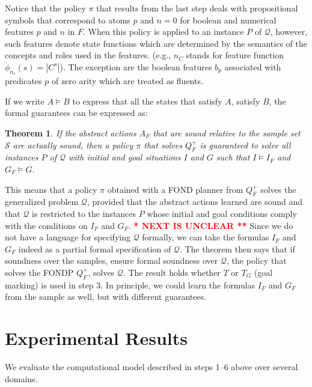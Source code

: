 \documentclass[letterpaper]{article} %
\newtheorem{theorem}[definition]{Theorem}
\newcommand{\Q}{\mathcal{Q}}
\renewcommand{\S}{\mathcal{S}}
\begin{document}
Notice that the policy $\pi$ that results from the last step deals with
propositional symbols that correspond to atoms $p$ and $n=0$ for boolean
and numerical features $p$ and $n$ in $F$.
When this policy is applied to an instance $P$ of $\Q$, however, such features denote state functions
which are determined by the  semantics of the concepts and roles used in  the features.
(e.g., $n_C$ stands for feature function $\phi_{n_c}(s)=|C^s|$).
The exception are the boolean features $b_p$ associated with
predicates $p$ of zero arity which are treated as fluents.

If we write $A \vDash B$ to express that all the states that satisfy $A$, satisfy $B$, 
the formal guarantees can be expressed as:

\begin{theorem}
If the abstract actions $A_F$ that are sound relative to the sample set $\S$  are actually sound,
then a   policy $\pi$ that solves  $Q^+_F$  is guaranteed to solve  all instances $P$ of $\Q$
with initial and goal situations $I$ and $G$ such that $I \vDash  I_F$ and $G_F \vDash G$.
\end{theorem}

This means that a policy $\pi$ obtained with a FOND planner from $Q^+_F$ 
solves the generalized problem $\Q$, provided that the abstract actions
learned are sound and that $\Q$ is restricted to the instances $P$ whose
initial and goal conditions comply with the conditions on $I_F$ and $G_F$.
\textcolor{red}{\bf ** NEXT IS UNCLEAR **}
Since we do not have a language for specifying $\Q$ formally, we can take
the formulas $I_F$ and $G_F$ indeed as a partial formal specification of
$\Q$. The theorem then says that if soundness over the samples, ensure
formal soundness over $\Q$, the policy that solves the FONDP $Q^+_F$,
solves $\Q$. The result holds whether $T$ or $T_G$ (goal marking) is used in step 3.
In principle, we could learn the formulas $I_F$ and $G_F$ from the sample as well,  but with different guarantees. 

\section{Experimental Results}

We evaluate the computational model described in steps 1--6 above over several domains.
%
\end{document}
